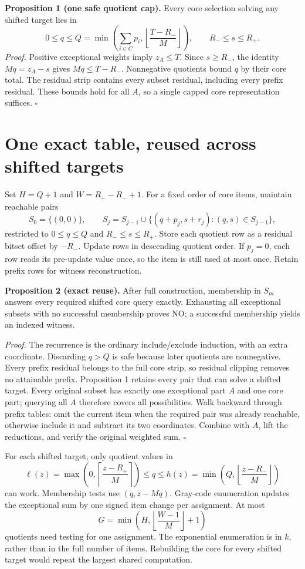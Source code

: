 \documentclass[10pt,english]{article}
\begin{document}
\textbf{Proposition 1 (one safe quotient cap).} Every core selection solving any shifted target lies in
$$
0\le q\le Q=\min\left(\sum_{i\in C}p_i,
\left\lfloor\frac{T-R_-}{M}\right\rfloor\right),
\qquad R_-\le s\le R_+.
$$
\emph{Proof.} Positive exceptional weights imply $z_A\le T$. Since $s\ge R_-$, the identity $Mq=z_A-s$ gives $Mq\le T-R_-$. Nonnegative quotients bound $q$ by their core total. The residual strip contains every subset residual, including every prefix residual. These bounds hold for all $A$, so a single capped core representation suffices. $\square$

\section{One exact table, reused across shifted targets}
Set $H=Q+1$ and $W=R_+-R_-+1$. For a fixed order of core items, maintain reachable pairs
$$
S_0=\{(0,0)\},\qquad
S_j=S_{j-1}\cup\{(q+p_j,s+r_j):(q,s)\in S_{j-1}\},
$$
restricted to $0\le q\le Q$ and $R_-\le s\le R_+$. Store each quotient row as a residual bitset offset by $-R_-$. Update rows in descending quotient order. If $p_j=0$, each row reads its pre-update value once, so the item is still used at most once. Retain prefix rows for witness reconstruction.

\textbf{Proposition 2 (exact reuse).} After full construction, membership in $S_m$ answers every required shifted core query exactly. Exhausting all exceptional subsets with no successful membership proves NO; a successful membership yields an indexed witness.

\emph{Proof.} The recurrence is the ordinary include/exclude induction, with an extra coordinate. Discarding $q>Q$ is safe because later quotients are nonnegative. Every prefix residual belongs to the full core strip, so residual clipping removes no attainable prefix. Proposition 1 retains every pair that can solve a shifted target. Every original subset has exactly one exceptional part $A$ and one core part; querying all $A$ therefore covers all possibilities. Walk backward through prefix tables: omit the current item when the required pair was already reachable, otherwise include it and subtract its two coordinates. Combine with $A$, lift the reductions, and verify the original weighted sum. $\square$

For each shifted target, only quotient values in
$$
\ell(z)=\max\left(0,\left\lceil\frac{z-R_+}{M}\right\rceil\right)
\le q\le
h(z)=\min\left(Q,\left\lfloor\frac{z-R_-}{M}\right\rfloor\right)
$$
can work. Membership tests use $(q,z-Mq)$. Gray-code enumeration updates the exceptional sum by one signed item change per assignment. At most
$$
G=\min\left(H,\left\lfloor\frac{W-1}{M}\right\rfloor+1\right)
$$
quotients need testing for one assignment. The exponential enumeration is in $k$, rather than in the full number of items. Rebuilding the core for every shifted target would repeat the largest shared computation.
\end{document}
